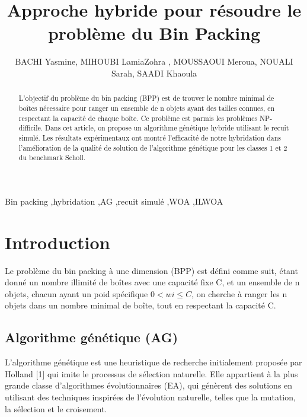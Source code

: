 \documentclass[preprint]{elsarticle}
\begin{document}
\pagestyle{fancy}
\begin{frontmatter}


\title{Approche hybride pour résoudre le problème du Bin Packing}
\author{BACHI Yasmine, MIHOUBI LamiaZohra , MOUSSAOUI Meroua, NOUALI Sarah, SAADI Khaoula}
\address{Ecole nationale Supérieure d'Informatique -ESI-Alger}
\begin{abstract}
L’objectif du problème du bin packing (BPP) est de trouver le nombre minimal de boîtes nécessaire pour ranger un ensemble de n objets ayant des tailles connues, en respectant la capacité de chaque boîte. Ce problème est parmis les problèmes NP-difficile. Dans cet article, on propose un algorithme génétique  hybride utilisant le recuit simulé. Les résultats expérimentaux   ont montré l’efficacité de notre hybridation dans l’amélioration de la qualité de solution de l’algorithme génétique pour les classes 1 et 2 du benchmark Scholl. \end{abstract}

\begin{keyword}
Bin packing \sep hybridation \sep AG \sep recuit simulé \sep WOA \sep ILWOA 
\end{keyword}

\end{frontmatter}


\section{Introduction}
\label{S:1}

Le problème du bin packing à une dimension (BPP) est défini comme suit, étant donné un nombre illimité de boîtes avec une capacité fixe C, et un ensemble de n objets, chacun ayant un poid spécifique $0<wi\leqslant C$, on cherche à ranger les n objets dans un nombre minimal de boîte, tout en respectant la capacité C. 


\subsection{Algorithme génétique (AG)}
L’algorithme génétique est une heuristique de recherche initialement proposée par Holland [1] qui imite le processus de sélection naturelle. Elle appartient à la plus grande classe d'algorithmes évolutionnaires (EA), qui génèrent des solutions en utilisant des techniques inspirées de l'évolution naturelle, telles que la mutation, la sélection et le croisement.
\end{document}

